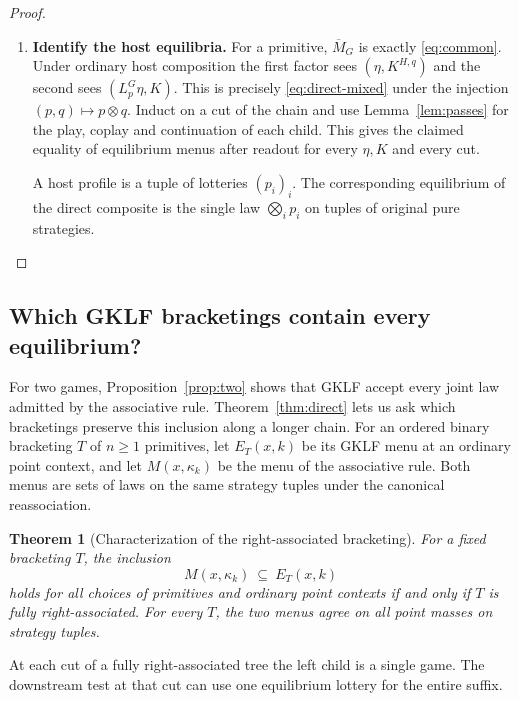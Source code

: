 \documentclass[11pt,a4paper]{article}
\newtheorem{theorem}{Theorem}[section]
\theoremstyle{definition}
\begin{document}
\begin{proof}
\begin{enumerate}[titledsteps]
        \item \textbf{Identify the host equilibria.} For a primitive, $\overline M_G$ is exactly \eqref{eq:common}. Under ordinary host composition the first factor sees $(\eta,K^{H,q})$ and the second sees $(L_p^G\eta,K)$. This is precisely \eqref{eq:direct-mixed} under the injection $(p,q)\mapsto p\otimes q$. Induct on a cut of the chain and use Lemma~\ref{lem:passes} for the play, coplay and continuation of each child. This gives the claimed equality of equilibrium menus after readout for every $\eta,K$ and every cut.

        A host profile is a tuple of lotteries $(p_i)_i$. The corresponding equilibrium of the direct composite is the single law $\bigotimes_i p_i$ on tuples of original pure strategies.\qedhere
    \end{enumerate}
\end{proof}

\subsection{Which GKLF bracketings contain every equilibrium?}

For two games, Proposition~\ref{prop:two} shows that GKLF accept every joint law admitted by the associative rule. Theorem~\ref{thm:direct} lets us ask which bracketings preserve this inclusion along a longer chain. For an ordered binary bracketing $T$ of $n\geq1$ primitives, let $E_T(x,k)$ be its GKLF menu at an ordinary point context, and let $M(x,\kappa_k)$ be the menu of the associative rule. Both menus are sets of laws on the same strategy tuples under the canonical reassociation.

\begin{theorem}[Characterization of the right-associated bracketing]\label{thm:comb}
    For a fixed bracketing $T$, the inclusion
    \[
        M(x,\kappa_k)\ \subseteq\ E_T(x,k)
    \]
    holds for all choices of primitives and ordinary point contexts if and only if $T$ is fully right-associated. For every $T$, the two menus agree on all point masses on strategy tuples.
\end{theorem}

At each cut of a fully right-associated tree the left child is a single game. The downstream test at that cut can use one equilibrium lottery for the entire suffix.
\end{document}
